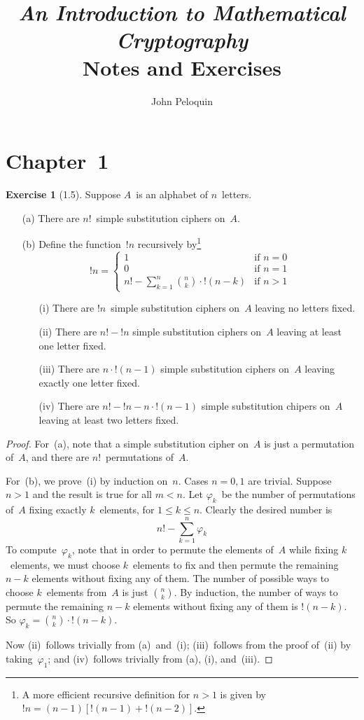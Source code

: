 \documentclass[letterpaper,12pt]{article}
\title{\textit{An Introduction to Mathematical Cryptography}\\Notes and Exercises}
\author{John Peloquin}
\date{}
\renewcommand{\times}{\mathop{\cdot}}
\theoremstyle{definition}
\newtheorem*{exer}{Exercise}
\begin{document}
\maketitle

\section*{Chapter~1}
\begin{exer}[1.5]
Suppose \(A\)~is an alphabet of \(n\)~letters.
\begin{enumerate}[itemsep=0pt]
\item[(a)] There are \(n!\)~simple substitution ciphers on~\(A\).
\item[(b)]
Define the function~\(!n\) recursively by\footnote{A more efficient recursive definition for \(n>1\) is given by \(!n=(n-1)[!(n-1)+!(n-2)]\).}
\[!n=\begin{cases}
1&\text{if }n=0\\
0&\text{if }n=1\\
n!-\sum_{k=1}^n\binom{n}{k}\times{!(n-k)}&\text{if }n>1
\end{cases}\]
\begin{enumerate}[itemsep=0pt]
\item[(i)] There are \(!n\)~simple substitution ciphers on~\(A\) leaving no letters fixed.
\item[(ii)] There are \(n!-{!n}\) simple substitution ciphers on~\(A\) leaving at least one letter fixed.
\item[(iii)] There are \(n\times{!(n-1)}\) simple substitution ciphers on~\(A\) leaving exactly one letter fixed.
\item[(iv)] There are \(n!-{!n}-n\times{!(n-1)}\) simple substitution chipers on~\(A\) leaving at least two letters fixed.
\end{enumerate}
\end{enumerate}
\end{exer}
\begin{proof}
For~(a), note that a simple substitution cipher on~\(A\) is just a permutation of~\(A\), and there are \(n!\)~permutations of~\(A\).

For~(b), we prove~(i) by induction on~\(n\). Cases \(n=0,1\) are trivial. Suppose \(n>1\) and the result is true for all \(m<n\). Let \(\varphi_k\)~be the number of permutations of~\(A\) fixing exactly \(k\)~elements, for \(1\le k\le n\). Clearly the desired number is
\[n!-\sum_{k=1}^n\varphi_k\]
To compute~\(\varphi_k\), note that in order to permute the elements of~\(A\) while fixing \(k\)~elements, we must choose \(k\)~elements to fix and then permute the remaining \(n-k\) elements without fixing any of them. The number of possible ways to choose \(k\)~elements from~\(A\) is just \(\binom{n}{k}\). By induction, the number of ways to permute the remaining \(n-k\) elements without fixing any of them is \(!(n-k)\). So \(\varphi_k=\binom{n}{k}\times{!(n-k)}\).

Now (ii)~follows trivially from (a)~and~(i); (iii)~follows from the proof of~(ii) by taking~\(\varphi_1\); and (iv)~follows trivially from (a), (i), and~(iii).
\end{proof}
\end{document}
